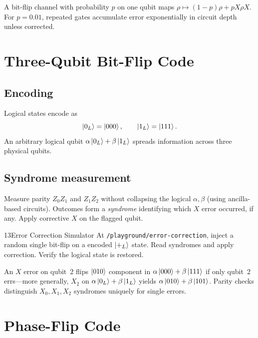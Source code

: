 \begin{example}
A bit-flip channel with probability $p$ on one qubit maps $\rho\mapsto (1-p)\rho + p X\rho X$. For $p=0.01$, repeated gates accumulate error exponentially in circuit depth unless corrected.
\end{example}

\section{Three-Qubit Bit-Flip Code}
\label{sec:bit-flip-code}

\subsection{Encoding}

Logical states encode as
\begin{equation}
\ket{0_L}=\ket{000},\qquad \ket{1_L}=\ket{111}.
\label{eq:bitflip-encoding}
\end{equation}
An arbitrary logical qubit $\alpha\ket{0_L}+\beta\ket{1_L}$ spreads information across three physical qubits.

\subsection{Syndrome measurement}

Measure parity $Z_0 Z_1$ and $Z_1 Z_2$ without collapsing the logical $\alpha,\beta$ (using ancilla-based circuits). Outcomes form a \emph{syndrome} identifying which $X$ error occurred, if any. Apply corrective $X$ on the flagged qubit.

\begin{labbox}{13}{Error Correction Simulator}
At \texttt{/playground/error-correction}, inject a random single bit-flip on a encoded $\ket{+_L}$ state. Read syndromes and apply correction. Verify the logical state is restored.
\end{labbox}

\begin{example}
An $X$ error on qubit~2 flips $\ket{010}$ component in $\alpha\ket{000}+\beta\ket{111}$ if only qubit~2 errs---more generally, $X_2$ on $\alpha\ket{0_L}+\beta\ket{1_L}$ yields $\alpha\ket{010}+\beta\ket{101}$. Parity checks distinguish $X_0,X_1,X_2$ syndromes uniquely for single errors.
\end{example}

\section{Phase-Flip Code}
\label{sec:phase-flip-code}

